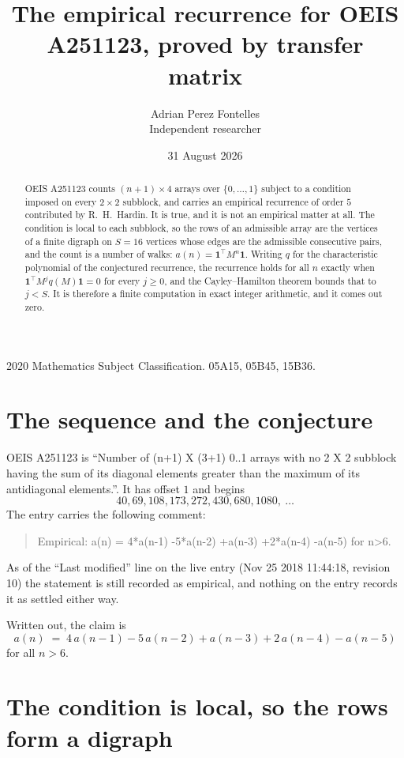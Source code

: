 \documentclass[11pt,a4paper]{article}
\title{The empirical recurrence for OEIS A251123, proved by transfer matrix}
\author{Adrian Perez Fontelles\\ \small Independent researcher}
\date{31 August 2026}
\theoremstyle{plain}
\theoremstyle{definition}
\begin{document}
\maketitle

\begin{abstract}
OEIS A251123 counts $(n+1)\times4$ arrays over $\{0,\dots,1\}$ subject to a condition imposed on
every $2\times2$ subblock, and carries an empirical recurrence of order $5$ contributed
by R.~H.~Hardin. It is true, and it is not an empirical matter at all. The condition is local
to each subblock, so the rows of an admissible array are the vertices of a finite digraph
on $S=16$ vertices whose edges are the admissible consecutive pairs, and the count is a
number of walks: $a(n)=\mathbf{1}^{\!\top}M^{n}\mathbf{1}$. Writing $q$
for the characteristic polynomial of the conjectured recurrence, the recurrence holds for all
$n$ exactly when $\mathbf{1}^{\!\top}M^{j}q(M)\mathbf{1}=0$ for every $j\ge0$, and the
Cayley--Hamilton theorem bounds that to $j<S$. It is therefore a finite computation in exact
integer arithmetic, and it comes out zero.
\end{abstract}

\noindent\small 2020 Mathematics Subject Classification. 05A15, 05B45, 15B36.\normalsize

\section{The sequence and the conjecture}

OEIS A251123 is ``Number of (n+1) X (3+1) 0..1 arrays with no 2 X 2 subblock having the sum of its diagonal elements greater than the maximum of its antidiagonal elements.''. It has offset $1$ and begins
\[
40, 69, 108, 173, 272, 430, 680, 1080,\ \dots
\]
The entry carries the following comment:
\begin{quote}\small
Empirical: a(n) = 4*a(n-1) -5*a(n-2) +a(n-3) +2*a(n-4) -a(n-5) for n>6.
\end{quote}
As of the ``Last modified'' line on the live entry (Nov 25 2018 11:44:18, revision 10) the statement is
still recorded as empirical, and nothing on the entry records it as settled either way.

Written out, the claim is
\begin{equation}\label{eq:conj}
a(n)\;=\;4\,a(n-1) - 5\,a(n-2) + a(n-3) + 2\,a(n-4) - a(n-5)
\end{equation}
for all $n>6$.

\section{The condition is local, so the rows form a digraph}
\end{document}
